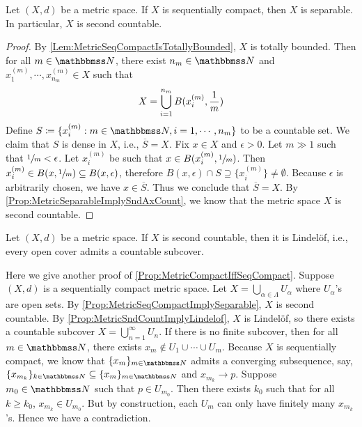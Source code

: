 \documentclass[screen,single]{techreport}
\numberwithin{equation}{section}
\begin{document}
\begin{proposition}\label{Prop:MetricSeqCompactImplySeparable}
	Let $(X,d)$ be a metric space.
	If $X$ is sequentially compact, then $X$ is separable.
	In particular, $X$ is second countable.
\end{proposition}
\begin{proof}
	By \cref{Lem:MetricSeqCompactIsTotallyBounded}, $X$ is totally bounded.
	Then for all $m \in \bbN$, there exist $n_m \in \bbN$ and $x^{(m)}_1,\cdots,x^{(m)}_{n_m} \in X$ such that
	\[
	X = \bigcup_{i=1}^{n_m} B({ x^{(m)}_i, \frac{1}{m}}) 
	\]
	Define $S \coloneqq \{ x^{(m)}_i : m \in \bbN, i=1,\cdots,n_m \}$ to be a countable set.
	We claim that $S$ is dense in $X$, i.e., $\overline{S} = X$.
	Fix $x \in X$ and $\epsilon > 0$.
	Let $m \gg 1$ such that $\sfrac{1}{m} < \epsilon$.
	Let $x^{(m)}_i$ be such that $x \in B(x^{(m)}_i, \sfrac{1}{m})$.
	Then $x^{(m)}_i \in B(x,\sfrac{1}{m}) \subseteq B(x,\epsilon)$, therefore $B(x,\epsilon) \cap S \supseteq \{ x^{(m)}_i \} \neq \emptyset$.
	Because $\epsilon$ is arbitrarily chosen, we have $x \in \overline{S}$.
	Thus we conclude that $\overline{S} = X$.
	By \cref{Prop:MetricSeparableImplySndAxCount}, we know that the metric space $X$ is second countable.
\end{proof}

\begin{proposition}\label{Prop:MetricSndCountImplyLindelof}
	Let $(X,d)$ be a metric space.
	If $X$ is second countable, then it is Lindel{\"o}f, i.e., every open cover admits a countable subcover.
\end{proposition}

\begin{remark}\label{Rem:AnotherProofMetricSeqCompactImplyCompact}
	Here we give another proof of \cref{Prop:MetricCompactIffSeqCompact}.
	Suppose $(X,d)$ is a sequentially compact metric space.
	Let $X = \bigcup_{\alpha \in \Lambda} U_\alpha$ where $U_\alpha$'s are open sets.
	By \cref{Prop:MetricSeqCompactImplySeparable}, $X$ is second countable.
	By \cref{Prop:MetricSndCountImplyLindelof}, $X$ is Lindel{\"o}f, so there exists a countable subcover $X = \bigcup_{n=1}^\infty U_n$.
	If there is no finite subcover, then for all $m \in \bbN$, there exists $x_m \not\in U_1 \cup \cdots \cup U_m$.
	Because $X$ is sequentially compact, we know that $\{x_m\}_{m \in \bbN}$ admits a converging subsequence, say, $\{x_{m_k}\}_{k \in \bbN} \subseteq \{ x_m \}_{m \in \bbN}$ and $x_{m_k} \rightarrow p$.
	Suppose $m_0 \in \bbN$ such that $p \in U_{m_0}$.
	Then there exists $k_0$ such that for all $k \ge k_0$, $x_{m_k} \in U_{m_0}$.
	But by construction, each $U_m$ can only have finitely many $x_{m_k}$'s.
	Hence we have a contradiction.
\end{remark}
\end{document}
